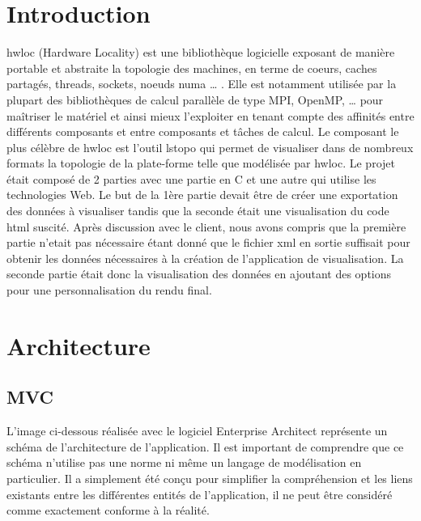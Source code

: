\documentclass [a4paper,11pt]{article}
\begin{document}
\tableofcontents

\newpage

\section{Introduction}

hwloc (Hardware Locality) est une bibliothèque logicielle exposant de manière portable et abstraite la topologie des machines, en terme de coeurs, caches partagés, threads, sockets, noeuds numa … . Elle est notamment utilisée par la plupart des bibliothèques de calcul parallèle de type MPI, OpenMP, … pour maîtriser le matériel et ainsi mieux l'exploiter en tenant compte des affinités entre différents composants et entre composants et tâches de calcul. Le composant le plus célèbre de hwloc est l'outil lstopo qui permet de visualiser dans de nombreux formats la topologie de la plate-forme telle que modélisée par hwloc.
Le projet était composé de 2 parties avec une partie en C et une autre qui utilise les technologies Web. Le but de la 1ère partie devait être de créer une exportation des données à visualiser tandis que la seconde était une visualisation du code html suscité. Après discussion avec le client, nous avons compris que la première partie n'etait pas nécessaire étant donné que le fichier xml en sortie suffisait pour obtenir les données nécessaires à la création de l'application de visualisation. La seconde partie était donc la visualisation des données en ajoutant des options pour une personnalisation du rendu final.

\newpage
\section{Architecture}

\subsection{MVC}
L’image ci-dessous réalisée avec le logiciel Enterprise Architect représente un schéma de l’architecture de l’application. Il est important de comprendre que ce schéma n’utilise pas une norme ni même un langage de modélisation en particulier. Il a simplement été conçu pour simplifier la compréhension et les liens existants entre les différentes entités de l’application, il ne peut être considéré comme exactement conforme à la réalité.
\newline
\end{document}
